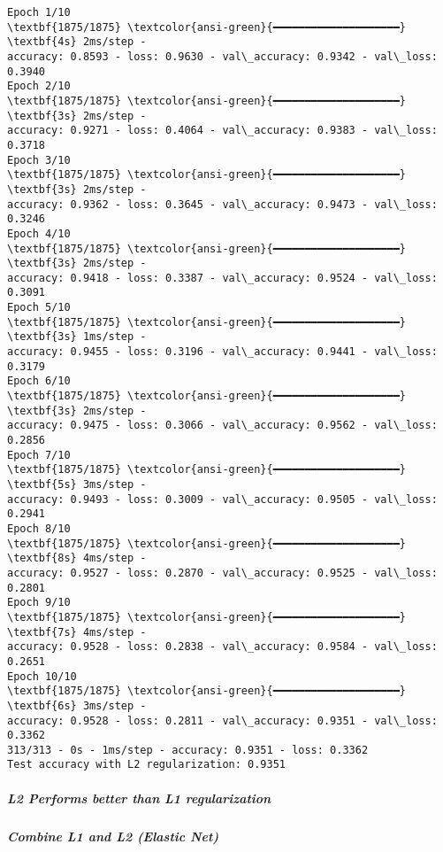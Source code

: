 \documentclass[11pt]{article}
\begin{document}
    \begin{Verbatim}[commandchars=\\\{\}]
Epoch 1/10
\textbf{1875/1875} \textcolor{ansi-green}{━━━━━━━━━━━━━━━━━━━━} \textbf{4s} 2ms/step -
accuracy: 0.8593 - loss: 0.9630 - val\_accuracy: 0.9342 - val\_loss: 0.3940
Epoch 2/10
\textbf{1875/1875} \textcolor{ansi-green}{━━━━━━━━━━━━━━━━━━━━} \textbf{3s} 2ms/step -
accuracy: 0.9271 - loss: 0.4064 - val\_accuracy: 0.9383 - val\_loss: 0.3718
Epoch 3/10
\textbf{1875/1875} \textcolor{ansi-green}{━━━━━━━━━━━━━━━━━━━━} \textbf{3s} 2ms/step -
accuracy: 0.9362 - loss: 0.3645 - val\_accuracy: 0.9473 - val\_loss: 0.3246
Epoch 4/10
\textbf{1875/1875} \textcolor{ansi-green}{━━━━━━━━━━━━━━━━━━━━} \textbf{3s} 2ms/step -
accuracy: 0.9418 - loss: 0.3387 - val\_accuracy: 0.9524 - val\_loss: 0.3091
Epoch 5/10
\textbf{1875/1875} \textcolor{ansi-green}{━━━━━━━━━━━━━━━━━━━━} \textbf{3s} 1ms/step -
accuracy: 0.9455 - loss: 0.3196 - val\_accuracy: 0.9441 - val\_loss: 0.3179
Epoch 6/10
\textbf{1875/1875} \textcolor{ansi-green}{━━━━━━━━━━━━━━━━━━━━} \textbf{3s} 2ms/step -
accuracy: 0.9475 - loss: 0.3066 - val\_accuracy: 0.9562 - val\_loss: 0.2856
Epoch 7/10
\textbf{1875/1875} \textcolor{ansi-green}{━━━━━━━━━━━━━━━━━━━━} \textbf{5s} 3ms/step -
accuracy: 0.9493 - loss: 0.3009 - val\_accuracy: 0.9505 - val\_loss: 0.2941
Epoch 8/10
\textbf{1875/1875} \textcolor{ansi-green}{━━━━━━━━━━━━━━━━━━━━} \textbf{8s} 4ms/step -
accuracy: 0.9527 - loss: 0.2870 - val\_accuracy: 0.9525 - val\_loss: 0.2801
Epoch 9/10
\textbf{1875/1875} \textcolor{ansi-green}{━━━━━━━━━━━━━━━━━━━━} \textbf{7s} 4ms/step -
accuracy: 0.9528 - loss: 0.2838 - val\_accuracy: 0.9584 - val\_loss: 0.2651
Epoch 10/10
\textbf{1875/1875} \textcolor{ansi-green}{━━━━━━━━━━━━━━━━━━━━} \textbf{6s} 3ms/step -
accuracy: 0.9528 - loss: 0.2811 - val\_accuracy: 0.9351 - val\_loss: 0.3362
313/313 - 0s - 1ms/step - accuracy: 0.9351 - loss: 0.3362
Test accuracy with L2 regularization: 0.9351
    \end{Verbatim}

    \subparagraph{L2 Performs better than L1
regularization}\label{l2-performs-better-than-l1-regularization}

    \subparagraph{Combine L1 and L2 (Elastic
Net)}\label{combine-l1-and-l2-elastic-net}
\end{document}

